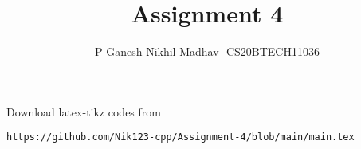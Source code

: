 \documentclass[journal,12pt,twocolumn]{IEEEtran}
\begin{document}
\newtheorem{theorem}{Theorem}[section]
\newtheorem{problem}{Problem}
\newtheorem{proposition}{Proposition}[section]
\newtheorem{lemma}{Lemma}[section]
\newtheorem{corollary}[theorem]{Corollary}
\newtheorem{example}{Example}[section]
\newtheorem{definition}[problem]{Definition}

\newcommand{\BEQA}{\begin{eqnarray}}
\newcommand{\EEQA}{\end{eqnarray}}
\newcommand{\define}{\stackrel{\triangle}{=}}

\raggedbottom
\setlength{\parindent}{0pt}
\providecommand{\mbf}{\mathbf}
\providecommand{\pr}[1]{\ensuremath{\Pr\left(#1\right)}}
\providecommand{\qfunc}[1]{\ensuremath{Q\left(#1\right)}}
\providecommand{\sbrak}[1]{\ensuremath{{}\left[#1\right]}}
\providecommand{\lsbrak}[1]{\ensuremath{{}\left[#1\right.}}
\providecommand{\rsbrak}[1]{\ensuremath{{}\left.#1\right]}}
\providecommand{\brak}[1]{\ensuremath{\left(#1\right)}}
\providecommand{\lbrak}[1]{\ensuremath{\left(#1\right.}}
\providecommand{\rbrak}[1]{\ensuremath{\left.#1\right)}}
\providecommand{\cbrak}[1]{\ensuremath{\left\{#1\right\}}}
\providecommand{\lcbrak}[1]{\ensuremath{\left\{#1\right.}}
\providecommand{\rcbrak}[1]{\ensuremath{\left.#1\right\}}}
\theoremstyle{remark}
\newtheorem{rem}{Remark}
\newcommand{\sgn}{\mathop{\mathrm{sgn}}}
\providecommand{\fourier}{\overset{\mathcal{F}}{ \rightleftharpoons}}
\providecommand{\system}{\overset{\mathcal{H}}{ \longleftrightarrow}}
\newcommand{\solution}{\noindent \textbf{Solution: }}
\newcommand{\cosec}{\,\text{cosec}\,}
\providecommand{\dec}[2]{\ensuremath{\overset{#1}{\underset{#2}{\gtrless}}}}
\newcommand{\myvec}[1]{\ensuremath{\begin{pmatrix}#1\end{pmatrix}}}
\newcommand{\mydet}[1]{\ensuremath{\begin{vmatrix}#1\end{vmatrix}}}
\makeatletter
{}
\makeatother
\let\StandardTheFigure\thefigure
\let\vec\mathbf
\renewcommand{\thefigure}{\theproblem}
\def\putbox#1#2#3{\makebox[0in][l]{\makebox[#1][l]{}\raisebox{\baselineskip}[0in][0in]{\raisebox{#2}[0in][0in]{#3}}}}
     \def\rightbox#1{\makebox[0in][r]{#1}}
     \def\centbox#1{\makebox[0in]{#1}}
     \def\topbox#1{\raisebox{-\baselineskip}[0in][0in]{#1}}
     \def\midbox#1{\raisebox{-0.5\baselineskip}[0in][0in]{#1}}
\vspace{3cm}
\title{Assignment 4}
\author{P Ganesh Nikhil Madhav -CS20BTECH11036}
\maketitle
\newpage
\bigskip
\renewcommand{\thefigure}{\theenumi}
\renewcommand{\thetable}{\theenumi}
Download latex-tikz codes from 
%
\begin{lstlisting}
https://github.com/Nik123-cpp/Assignment-4/blob/main/main.tex
\end{lstlisting}
\end{document}
